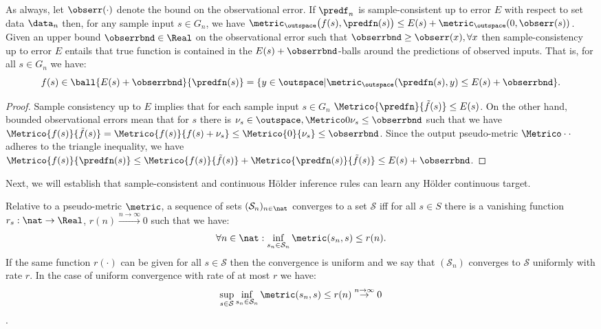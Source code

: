 \begin{lem}\label{lem:groups_sampleconsandobserr} As always, let $\obserr(\cdot) $ denote the bound on the observational error.
If $\predf_n$ is sample-consistent up to error $E$ with respect to set data $\data_n$ then, for any sample input $s \in G_n$, we have $\metric_\outspace\bigl(f(s), \predfn(s) \bigr) \leq E(s) + \metric_\outspace(0,\obserr(s))$.  Given an upper bound  $\obserrbnd \in \Real$ on the observational error  such that $\obserrbnd \geq \obserr(x),\forall x$ then sample-consistency up to error $E$ entails that true function is contained in the $E(s) + \obserrbnd$-balls around the predictions of observed inputs. That is, for all $s \in G_n$ we have:
\begin{equation}
 f(s) \in \ball{ E(s) + \obserrbnd}{\predfn(s)} = \{y \in \outspace | \metric_\outspace(\predfn(s),y ) \leq E(s) + \obserrbnd \}.
\end{equation}
\end{lem}
\begin{proof}
Sample consistency up to $E$ implies that for each sample input $s \in G_n$ $\Metrico{\predfn}{\tilde f(s)} \leq E(s)$.
On the other hand, bounded observational errors mean that for $s$ 
there is $\nu_s \in \outspace, \Metrico 0 {\nu_s} \leq \obserrbnd$ such that we have $\Metrico{f(s)}{ \tilde f(s) } = \Metrico{f(s)}{ f(s)+\nu_s } \leq \Metrico{0}{\nu_s } \leq \obserrbnd$.
Since the output pseudo-metric $\Metrico \cdot \cdot$ adheres to the triangle inequality, we have 
$\Metrico{f(s)}{\predfn(s)} \leq \Metrico{f(s)}{ \tilde f(s) } + \Metrico{\predfn(s)}{ \tilde f(s) } \leq E(s) + \obserrbnd $.
\end{proof}

Next, we will establish that sample-consistent and continuous H\"older inference rules can learn any H\"older continuous target.

\begin{defn}
Relative to a pseudo-metric $\metric$, a sequence of sets $(\mathcal S_n)_{n \in \nat}$ converges to a set $\mathcal S$ iff  for all $s \in S$ there is a vanishing function $r_s:\nat \to \Real$, $r(n) \stackrel{n \to \infty} {\to} 0$ such that we have:  $$ \forall n \in \nat: \inf_{s_n \in \mathcal S_n} \metric(s_n,s)\leq r(n).$$
If the same function $r(\cdot)$ can be given for all $s \in \mathcal S$ then the convergence is uniform and we say that $(\mathcal S_n)$ converges to $\mathcal S$ uniformly with rate $r$. In the case of uniform convergence with rate of at most $r$ we have: $$\sup_{s \in \mathcal S} \inf_{s_n \in \mathcal S_n} \metric(s_n,s) \leq r(n) \stackrel{n \to \infty}{\to} 0$$.
\end{defn}


